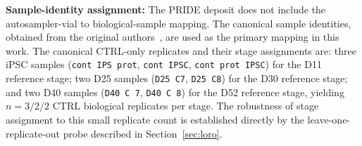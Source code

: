 \documentclass[5p,times,twocolumn]{elsarticle}
\newcommand{\rtag}[1]{}
\newcommand{\lang}[1]{#1}
\begin{document}
\begin{table}[!htbp]
  \color{black}
  \caption{\rtag{R2.5}Canonical CTRL proteomic replicates: sample
    label, stage assignment, number of replicates $n$ in the
    stage, per-marker abundance
    ($\log_{2}(1+\text{LFQ})$; n.q.\ = not quantified, LFQ $= 0$,
    entering Eq.~\eqref{eq:Pr} as 0),
    and the replicate-level proteomic score $Pr$
    (Eq.~\eqref{eq:Pr}).}
  \label{tab:replicates}
  \centering
\end{table}

\textbf{Sample-identity assignment:}
The PRIDE deposit does not include the autosampler-vial to
biological-sample mapping.
The canonical sample identities, \lang{obtained from the original} authors~\cite{novak2022single}, are used as the primary mapping in this work.
The canonical CTRL-only replicates and their stage
assignments are: three iPSC samples (\texttt{cont IPS prot},
\texttt{cont IPSC}, \texttt{cont prot IPSC}) for the D11
reference stage; two D25 samples (\texttt{D25 C7},
\texttt{D25 C8}) for the D30 reference stage; and two D40
samples (\texttt{D40 C 7}, \texttt{D40 C 8}) for the D52
reference stage, yielding $n = 3/2/2$ CTRL biological
replicates per stage.
The robustness of stage assignment to this small replicate
count is established directly by the leave-one-replicate-out
probe described in Section~\ref{sec:loro}.
\end{document}
